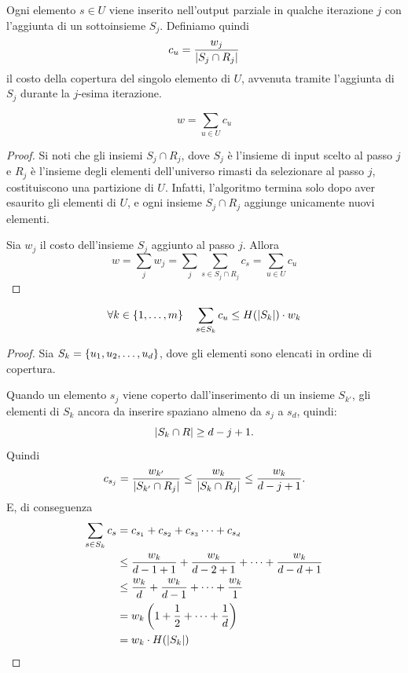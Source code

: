Ogni elemento $s\in U$ viene inserito nell'output parziale in qualche iterazione $j$ con l'aggiunta di un sottoinsieme $S_j$. Definiamo quindi
\begin{equation*}
	c_u = \frac{w_j}{| S_j\cap R_j |}
\end{equation*}
il costo della copertura del singolo elemento di $U$, avvenuta tramite l'aggiunta di $S_j$ durante la $j$-esima iterazione.

\begin{lemma}\label{lem:gsetcov_w_sum_c_u}
	\begin{equation*}
		w=\sum_{u\in U} c_u
	\end{equation*}
\end{lemma}
\begin{proof}
	Si noti che gli insiemi $S_j\cap R_j$, dove $S_j$ è l'insieme di input scelto al passo $j$ e $R_j$ è l'insieme degli elementi dell'universo rimasti da selezionare al passo $j$, costituiscono una partizione di $U$. Infatti, l'algoritmo termina solo dopo aver esaurito gli elementi di $U$, e ogni insieme $S_j\cap R_j$ aggiunge unicamente nuovi elementi.

	Sia $w_j$ il costo dell'insieme $S_j$ aggiunto al passo $j$. Allora
	\begin{equation*}
		w = \sum_j w_j=\sum_j\sum_{s\in S_j\cap R_j} c_s=\sum_{u\in U} c_u
	\end{equation*}
\end{proof}
\begin{lemma}\label{lem:gsetcov_cu_leq_harmoskwk}
	\begin{equation*}
		\forall k\in\left\{ 1,\dots,m \right\} \quad\sum_{s\in S_k} c_u\leq H(| S_k |) \cdot w_k
	\end{equation*}
\end{lemma}
\begin{proof}
	Sia $S_k=\left\{ u_1,u_2,\dots,u_d \right\}$, dove gli elementi sono elencati in ordine di copertura.

	Quando un elemento $s_j$ viene coperto dall'inserimento di un insieme $S_{k'}$, gli elementi di $S_k$ ancora da inserire spaziano almeno da $s_j$ a $s_d$, quindi:
	\begin{equation*}
		| S_k\cap R |\geq d-j+1 \text.
	\end{equation*}
	Quindi
	\begin{equation*}
		c_{s_j}=\frac{w_{k'}}{| S_{k'}\cap R_j |}
		\leq\frac{w_k}{| S_k\cap R_j |}
		\leq\frac{w_k}{d-j+1} \text.
	\end{equation*}
	E, di conseguenza
	\begin{align*}
		\sum_{s\in S_k} c_s & =c_{s_1}+c_{s_2}+c_{s_3}\dots+c_{s_d}                            \\
		                    & \leq \frac{w_k}{d-1+1}+\frac{w_k}{d-2+1}+\dots+\frac{w_k}{d-d+1} \\
		                    & \leq \frac{w_k}{d}+\frac{w_k}{d-1}+\dots+\frac{w_k}{1}           \\
		                    & = w_k\left(1 + \frac{1}{2} + \dots + \frac{1}{d}\right)          \\
		                    & = w_k\cdot H(| S_k |)
	\end{align*}
\end{proof}

